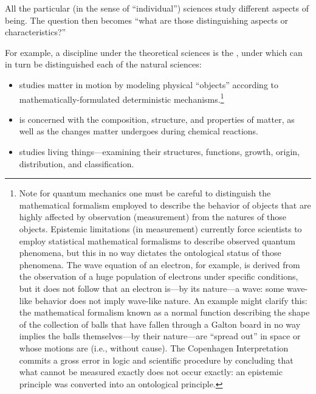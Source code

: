 All the particular (in the sense of ``individual'') sciences study different aspects of being. The question then becomes ``what are those  distinguishing aspects or characteristics?''

For example, a discipline under the theoretical sciences is the , under which can in turn be distinguished each of the natural sciences:


\begin{itemize}
\item {} studies matter in motion by modeling physical ``objects'' according to mathematically-formulated deterministic mechanisms.\footnote{Note for quantum mechanics one must be careful to distinguish the mathematical formalism employed to describe the behavior of objects that are highly affected by observation (measurement) from the natures of those objects. Epistemic limitations (in measurement) currently force scientists to employ statistical mathematical formalisms to describe observed quantum phenomena, but this in no way dictates the ontological status of those phenomena. The wave equation of an electron, for example, is derived from the observation of a huge population of electrons under specific conditions, but it does not follow that an electron is---by its nature---a wave: some wave-like behavior does not imply wave-like nature. An example might clarify this: the mathematical formalism known as a normal function describing the shape of the collection of balls that have fallen through a Galton board in no way implies the balls themselves---by their nature---are ``spread out'' in space or whose motions are  (i.e., without cause). The Copenhagen Interpretation commits a gross error in logic and scientific procedure by concluding that what cannot be measured exactly does not occur exactly: an epistemic principle was converted into an ontological principle.}
\item {} is concerned with the composition, structure, and properties of matter, as well as the changes matter undergoes during chemical reactions.
\item {} studies living things---examining their structures, functions, growth, origin, distribution, and classification.
\end{itemize}

